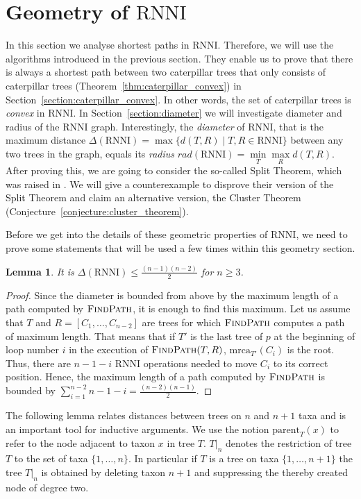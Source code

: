 \documentclass{amsart}
\newcommand{\parent}{\mathrm{parent}}
\newcommand{\mrca}{\mathrm{mrca}}
\newcommand{\rnni}{\mathrm{RNNI}}
\newcommand{\findpath}{\textsc{FindPath}}
\newtheorem{lemma}[definition]{Lemma}
\begin{document}
\section{Geometry of $\rnni$}
\label{section:geometry}

In this section we analyse shortest paths in $\rnni$.
Therefore, we will use the algorithms introduced in the previous section.
They enable us to prove that there is always a shortest path between two caterpillar trees that only consists of caterpillar trees (Theorem~\ref{thm:caterpillar_convex}) in Section~\ref{section:caterpillar_convex}.
In other words, the set of caterpillar trees is \emph{convex} in $\rnni$.
In Section~\ref{section:diameter} we will investigate diameter and radius of the $\rnni$ graph.
Interestingly, the \emph{diameter} of $\rnni$, that is the maximum distance $\Delta(\rnni) = \max \{d(T, R) \mid T, R \in \rnni\}$ between any two trees in the graph, equals its \emph{radius} $rad(\rnni) = \min\limits_T \max\limits_R d(T,R)$.
After proving this, we are going to consider the so-called Split Theorem, which was raised in \autocite{Gavryushkin2018-ol}.
We will give a counterexample to disprove their version of the Split Theorem and claim an alternative version, the Cluster Theorem (Conjecture~\ref{conjecture:cluster_theorem}).

Before we get into the details of these geometric properties of $\rnni$, we need to prove some statements that will be used a few times within this geometry section.

\begin{lemma}
It is $\Delta(\rnni) \leq \frac{(n-1)(n-2)}{2}$ for $n \geq 3$.
\label{lemma:diameter_bound}
\end{lemma}

\begin{proof}
Since the diameter is bounded from above by the maximum length of a path computed by $\findpath$, it is enough to find this maximum.
Let us assume that $T$ and $R = [C_1, \ldots, C_{n-2}]$ are trees for which $\findpath$ computes a path of maximum length.
That means that if $T'$ is the last tree of $p$ at the beginning of loop number $i$ in the execution of $\findpath(T,R)$, $\mrca_{T'}(C_i)$ is the root.
Thus, there are $n-1-i$ $\rnni$ operations needed to move $C_i$ to its correct position.
Hence, the maximum length of a path computed by $\findpath$ is bounded by $\sum\limits_{i = 1}^{n-2} n-1-i = \frac{(n-2)(n-1)}{2}$.
\end{proof}

The following lemma relates distances between trees on $n$ and $n+1$ taxa and is an important tool for inductive arguments.
We use the notion $\parent_T(x)$ to refer to the node adjacent to taxon $x$ in tree $T$.
$T{\big|}_n$ denotes the restriction of tree $T$ to the set of taxa $\{1, \ldots, n\}$.
In particular if $T$ is a tree on taxa $\{1, \ldots, n+1\}$ the tree $T{\big|}_n$ is obtained by deleting taxon $n+1$ and suppressing the thereby created node of degree two.
\end{document}
